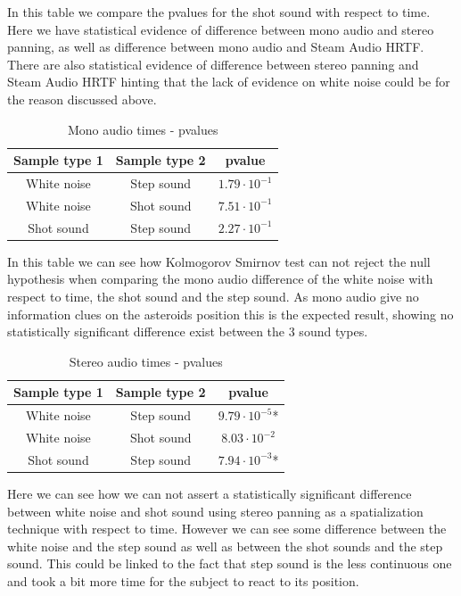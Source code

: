 \documentclass[conference]{IEEEtran}
\begin{document}
In this table we compare the pvalues for the shot sound with respect to time. Here we have statistical evidence of difference between mono audio and stereo panning, as well as difference between mono audio and Steam Audio HRTF. There are also statistical evidence of difference between stereo panning and Steam Audio HRTF hinting that the lack of evidence on white noise could be for the reason discussed above.

\begin{table}[htbp]
\caption{Mono audio times - pvalues}
\begin{center}
\begin{tabular}{|c|c|c|}
\hline
\textbf{Sample type 1} & \textbf{Sample type 2} & \textbf{pvalue}\\
\hline
White noise & Step sound & $1.79 \cdot 10^{-1}$\\
\hline
White noise & Shot sound & $7.51 \cdot 10^{-1}$\\
\hline
Shot sound & Step sound & $2.27 \cdot 10^{-1}$\\
\hline
\end{tabular}
\label{tab4}
\end{center}
\end{table}

In this table we can see how Kolmogorov Smirnov test can not reject the null hypothesis when comparing the mono audio difference of the white noise with respect to time, the shot sound and the step sound. As mono audio give no information clues on the asteroids position this is the expected result, showing no statistically significant difference exist between the 3 sound types.

\begin{table}[htbp]
\caption{Stereo audio times - pvalues}
\begin{center}
\begin{tabular}{|c|c|c|}
\hline
\textbf{Sample type 1} & \textbf{Sample type 2} & \textbf{pvalue}\\
\hline
White noise & Step sound & $9.79 \cdot 10^{-5}$*\\
\hline
White noise & Shot sound & $8.03 \cdot 10^{-2}$\\
\hline
Shot sound & Step sound & $7.94 \cdot 10^{-3}$*\\
\hline
\end{tabular}
\label{tab6}
\end{center}
\end{table}

Here we can see how we can not assert a statistically significant difference between white noise and shot sound using stereo panning as a spatialization technique with respect to time. However we can see some difference between the white noise and the step sound as well as between the shot sounds and the step sound. This could be linked to the fact that step sound is the less continuous one and took a bit more time for the subject to react to its position.
\end{document}
